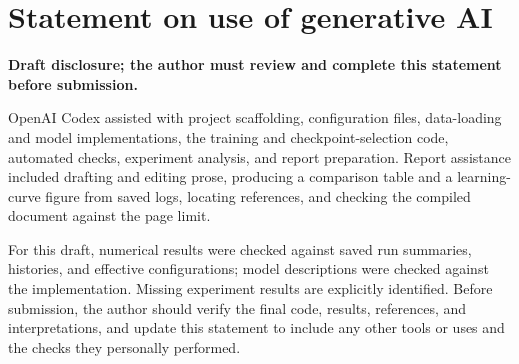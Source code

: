 \section*{Statement on use of generative AI}
\textbf{Draft disclosure; the author must review and complete this
statement before submission.}

OpenAI Codex assisted with project scaffolding, configuration files,
data-loading and model implementations, the training and checkpoint-selection
code, automated checks, experiment analysis, and report preparation. Report
assistance included drafting and editing prose, producing a comparison table
and a learning-curve figure from saved logs, locating references, and checking
the compiled document against the page limit.

For this draft, numerical results were checked against saved run summaries,
histories, and effective configurations; model descriptions were checked
against the implementation. Missing experiment results are explicitly
identified. Before submission, the author should verify the final code,
results, references, and interpretations, and update this statement to
include any other tools or uses and the checks they personally performed.
